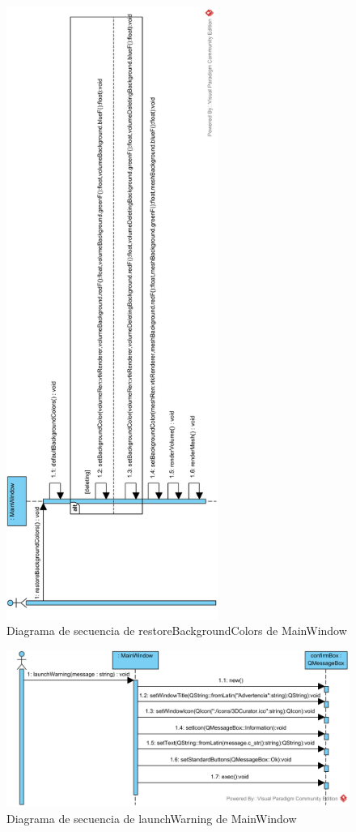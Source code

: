 \begin{figure}[H]
	\centering
	\includegraphics[height=20cm]{imagenes/diagramas/secuencia/MainWindow_RestoreBackgroundColors}
	\caption{Diagrama de secuencia de restoreBackgroundColors de MainWindow}
	\label{fig:diagrama_secuencia_mainWindow_restoreBackgroundColors}
\end{figure}

\begin{figure}[H]
	\centering
	\includegraphics[width=12cm]{imagenes/diagramas/secuencia/MainWindow_LaunchWarning}
	\caption{Diagrama de secuencia de launchWarning de MainWindow}
	\label{fig:diagrama_secuencia_mainWindow_launchWarning}
\end{figure}

